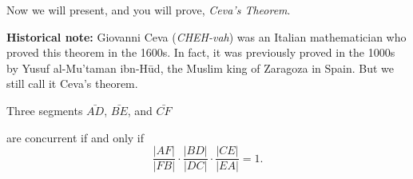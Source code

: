 \documentclass[newpage,hints,handout,nooutcomes,noauthor,12pt]{ximera}
\begin{document}
Now we will present, and you will prove, \textit{Ceva's Theorem}. %

\textbf{Historical note:} Giovanni Ceva (\emph{CHEH-vah}) was an Italian
mathematician who proved this theorem in the 1600s.  In fact, it was previously
proved in the 1000s by Yusuf al-Mu'taman ibn-H\=ud, the Muslim king of Zaragoza
in Spain.  But we still call it Ceva's theorem.

\begin{theorem}
Three segments $\bar{AD}$, $\bar{BE}$, and $\bar{CF}$
\begin{image}
\end{image}
are concurrent if and only if 
\[
\frac{|AF|}{|FB|}\cdot\frac{|BD|}{|DC|}\cdot\frac{|CE|}{|EA|}=1.
\]
\end{theorem}
\end{document}
